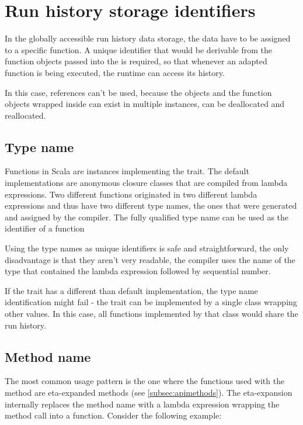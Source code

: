 \section{Run history storage identifiers}

In the globally accessible run history data storage, the data have to be assigned to a specific function. A unique identifier that would be derivable from the function objects passed into the  is required, so that whenever an adapted function is being executed, the runtime can access its history. 

In this case, references can't be used, because the  objects and the function objects wrapped inside can exist in multiple instances, can be deallocated and reallocated.

\subsection{Type name}

Functions in Scala are instances implementing the  trait. The default implementations are anonymous closure classes that are compiled from lambda expressions. Two different functions originated in two different lambda expressions and thus have two different type names, the ones that were generated and assigned by the compiler. The fully qualified type name can be used as the identifier of a function

Using the type names as unique identifiers is safe and straightforward, the only disadvantage is that they aren't very readable, the compiler uses the name of the type that contained the lambda expression followed by sequential number.

If the  trait has a different than default implementation, the type name identification might fail - the trait can be implemented by a single class wrapping other values. In this case, all functions implemented by that class would share the run history.

\subsection{Method name}
\label{subsec:methodnameident}

The most common usage pattern is the one where the functions used with the  method are eta-expanded methods (see \ref{subsec:apimethods}). The eta-expansion internally replaces the method name with a lambda expression wrapping the method call into a function. Consider the following example:

